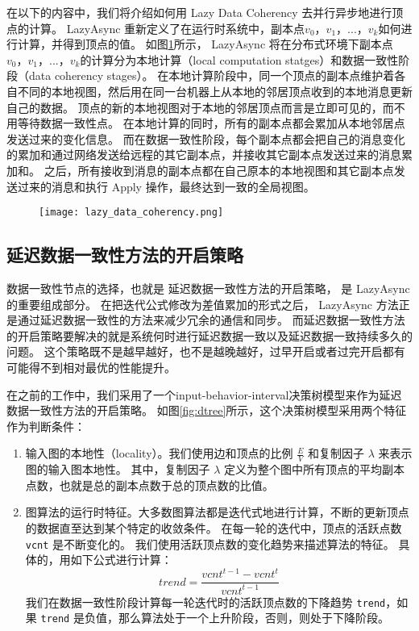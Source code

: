 在以下的内容中，我们将介绍如何用 Lazy Data Coherency 去并行异步地进行顶点的计算。
LazyAsync 重新定义了在运行时系统中，副本点$v_0， v_1， ...， v_k$如何进行计算，并得到顶点的值。
如图\ref{fig:lazy_data_coherency}所示，
LazyAsync 将在分布式环境下副本点$v_0， v_1， ...， v_k$的计算分为本地计算（local computation statges）和数据一致性阶段（data coherency stages）。
在本地计算阶段中，同一个顶点的副本点维护着各自不同的本地视图，然后用在同一台机器上从本地的邻居顶点收到的本地消息更新自己的数据。
顶点的新的本地视图对于本地的邻居顶点而言是立即可见的，而不用等待数据一致性点。
在本地计算的同时，所有的副本点都会累加从本地邻居点发送过来的变化信息。
而在数据一致性阶段，每个副本点都会把自己的消息变化的累加和通过网络发送给远程的其它副本点，并接收其它副本点发送过来的消息累加和。
之后，所有接收到消息的副本点都在自己原本的本地视图和其它副本点发送过来的消息和执行 Apply 操作，最终达到一致的全局视图。
\begin{figure}[!htbp]
\centering
\texttt{[image: lazy\_data\_coherency.png]}
\label{fig:lazy_data_coherency}
\end{figure}

\subsection{延迟数据一致性方法的开启策略}

数据一致性节点的选择，也就是 延迟数据一致性方法的开启策略， 是 LazyAsync 的重要组成部分。
在把迭代公式修改为差值累加的形式之后， LazyAsync 方法正是通过延迟数据一致性的方法来减少冗余的通信和同步。
而延迟数据一致性方法的开启策略要解决的就是系统何时进行延迟数据一致以及延迟数据一致持续多久的问题。
这个策略既不是越早越好，也不是越晚越好，过早开启或者过完开启都有可能得不到相对最优的性能提升。


在之前的工作中，我们采用了一个input-behavior-interval决策树模型来作为延迟数据一致性方法的开启策略。
如图\ref{fig:dtree}所示，这个决策树模型采用两个特征作为判断条件：

\begin{enumerate}
  \item 输入图的本地性（locality）。我们使用边和顶点的比例 $\frac{E}{V}$ 和复制因子 $\lambda$ 来表示图的输入图本地性。
  其中，复制因子 $\lambda$ 定义为整个图中所有顶点的平均副本点数，也就是总的副本点数于总的顶点数的比值。
  \item 图算法的运行时特征。大多数图算法都是迭代式地进行计算，不断的更新顶点的数据直至达到某个特定的收敛条件。
  在每一轮的迭代中，顶点的活跃点数\verb|vcnt| 是不断变化的。
  我们使用活跃顶点数的变化趋势来描述算法的特征。
  具体的，用如下公式进行计算：
  \begin{equation}
  \label{equ:chap04:trend}
  trend = \frac{vcnt^{t-1}-vcnt^t}{vcnt^{t-1}}
  \end{equation}
  我们在数据一致性阶段计算每一轮迭代时的活跃顶点数的下降趋势 \verb|trend|，如果 \verb|trend| 是负值，那么算法处于一个上升阶段，否则，则处于下降阶段。
\end{enumerate}

